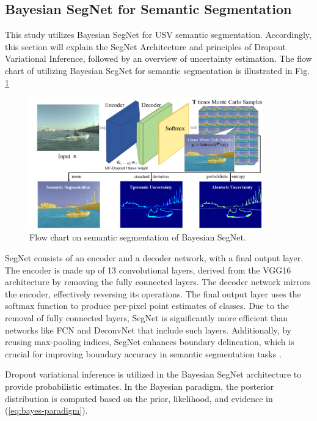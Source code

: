 \subsection{Bayesian SegNet for Semantic Segmentation}
This study utilizes Bayesian SegNet for USV semantic segmentation. Accordingly, this section will explain 
the SegNet Architecture and principles of Dropout Variational Inference, followed by an overview of uncertainty 
estimation. The flow chart of utilizing Bayesian SegNet for semantic segmentation is illustrated in Fig.
\ref{fig:flowchart}
\begin{figure}[ht]
    \centering
    \includegraphics[width=0.9\textwidth]{figures/flowchart.png}
    \caption{Flow chart on semantic segmentation of Bayesian SegNet.}
    \label{fig:flowchart}
\end{figure}

SegNet consists of an encoder and a decoder network, with a final output layer. The encoder is made up of 13 
convolutional layers, derived from the VGG16 architecture by removing the fully connected layers. The decoder 
network mirrors the encoder, effectively reversing its operations. The final output layer uses the softmax function 
to produce per-pixel point estimates of classes. Due to the removal of fully connected layers, SegNet is 
significantly more efficient than networks like FCN and DeconvNet that include such layers. Additionally, by 
reusing max-pooling indices, SegNet enhances boundary delineation, which is crucial for improving boundary accuracy 
in semantic segmentation tasks \cite{SegNet}.

 Dropout variational inference is utilized in the Bayesian SegNet architecture to provide probabilistic estimates. 
 In the Bayesian paradigm, the posterior distribution is computed based on the prior, likelihood, and evidence in 
 (\ref{eq:bayes-paradigm}). 

